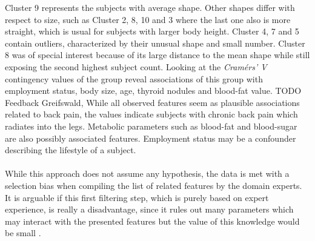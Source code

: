 \documentclass[journal]{style/vgtc} 			          %
\begin{document}
Cluster 9 represents the subjects with average shape.
%
Other shapes differ with respect to size, such as Cluster 2, 8, 10 and 3 where the last one also is more straight, which is usual for subjects with larger body height.
%
Cluster 4, 7 and 5 contain outliers, characterized by their unusual shape and small number.
%
Cluster 8 was of special interest because of its large distance to the mean shape while still exposing the second highest subject count.
%
Looking at the \emph{Cram\'{e}rs' V} contingency values of the group reveal associations of this group with employment status, body size, age, thyroid nodules and blood-fat value.
%
TODO Feedback Greifswald, 
While all observed features seem as plausible associations related to back pain, the values indicate subjects with chronic back pain which radiates into the legs.
%
Metabolic parameters such as blood-fat and blood-sugar are also possibly associated features.
%
Employment status may be a confounder describing the lifestyle of a subject.
\\\\
While this approach does not assume any hypothesis, the data is met with a selection bias when compiling the list of related features by the domain experts.
%
It is arguable if this first filtering step, which is purely based on expert experience, is really a disadvantage, since it rules out many parameters which may interact with the presented features but the value of this knowledge would be small \cite{Wiley2008}.
\end{document}
